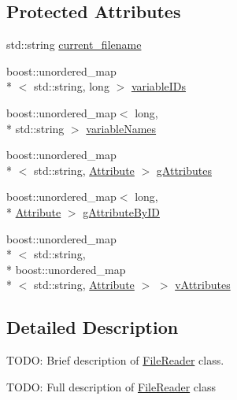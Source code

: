\subsection*{Protected Attributes}
\begin{DoxyCompactItemize}
\item 
std\-::string \hyperlink{classccmc_1_1_file_reader_a2afb0635bf14f222991efc4d63e5f17a}{current\-\_\-filename}
\item 
boost\-::unordered\-\_\-map\\*
$<$ std\-::string, long $>$ \hyperlink{classccmc_1_1_file_reader_af87bd665411c9c8ce943040ff5b13055}{variable\-I\-Ds}
\item 
boost\-::unordered\-\_\-map$<$ long, \\*
std\-::string $>$ \hyperlink{classccmc_1_1_file_reader_a94d580d26fd966be477efb3fd9877ea9}{variable\-Names}
\item 
boost\-::unordered\-\_\-map\\*
$<$ std\-::string, \hyperlink{classccmc_1_1_attribute}{Attribute} $>$ \hyperlink{classccmc_1_1_file_reader_a5bf4b49e31f23ce0d5a0098809ea464a}{g\-Attributes}
\item 
boost\-::unordered\-\_\-map$<$ long, \\*
\hyperlink{classccmc_1_1_attribute}{Attribute} $>$ \hyperlink{classccmc_1_1_file_reader_a4225f8abbbb74ca9a18b9a0ea419f978}{g\-Attribute\-By\-I\-D}
\item 
boost\-::unordered\-\_\-map\\*
$<$ std\-::string, \\*
boost\-::unordered\-\_\-map\\*
$<$ std\-::string, \hyperlink{classccmc_1_1_attribute}{Attribute} $>$ $>$ \hyperlink{classccmc_1_1_file_reader_a1eb038b0d8cb945df2b02c4cb63d0aa3}{v\-Attributes}
\end{DoxyCompactItemize}


\subsection{Detailed Description}
T\-O\-D\-O\-: Brief description of \hyperlink{classccmc_1_1_file_reader}{File\-Reader} class. 

T\-O\-D\-O\-: Full description of \hyperlink{classccmc_1_1_file_reader}{File\-Reader} class 

